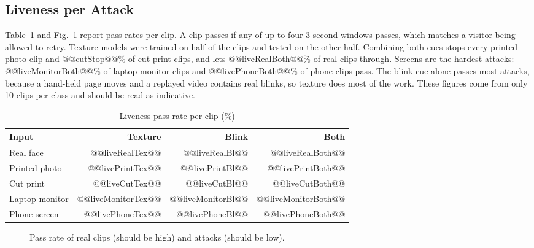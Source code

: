 \documentclass[conference,a4paper]{IEEEtran}
\begin{document}
\subsection{Liveness per Attack}
Table~\ref{tab:live} and Fig.~\ref{fig:live} report pass rates per clip. A clip passes if any of up to four 3-second windows passes, which matches a visitor being allowed to retry. Texture models were trained on half of the clips and tested on the other half. Combining both cues stops every printed-photo clip and @@cutStop@@\% of cut-print clips, and lets @@liveRealBoth@@\% of real clips through. Screens are the hardest attacks: @@liveMonitorBoth@@\% of laptop-monitor clips and @@livePhoneBoth@@\% of phone clips pass. The blink cue alone passes most attacks, because a hand-held page moves and a replayed video contains real blinks, so texture does most of the work. These figures come from only 10 clips per class and should be read as indicative.

\begin{table}[t]
\caption{Liveness pass rate per clip (\%)}
\label{tab:live}
\centering\footnotesize
\begin{tabular}{@{}lrrr@{}}
\toprule
Input & Texture & Blink & Both \\
\midrule
Real face & @@liveRealTex@@ & @@liveRealBl@@ & @@liveRealBoth@@ \\
Printed photo & @@livePrintTex@@ & @@livePrintBl@@ & @@livePrintBoth@@ \\
Cut print & @@liveCutTex@@ & @@liveCutBl@@ & @@liveCutBoth@@ \\
Laptop monitor & @@liveMonitorTex@@ & @@liveMonitorBl@@ & @@liveMonitorBoth@@ \\
Phone screen & @@livePhoneTex@@ & @@livePhoneBl@@ & @@livePhoneBoth@@ \\
\bottomrule
\end{tabular}
\end{table}

\begin{figure}[t]
\centering
{}
\caption{Pass rate of real clips (should be high) and attacks (should be low).}
\label{fig:live}
\end{figure}
\end{document}
